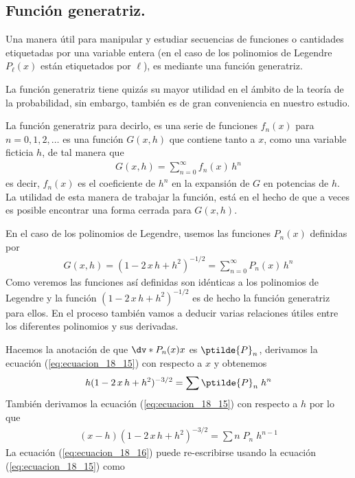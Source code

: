 \subsection{Función generatriz.}
Una manera útil para manipular y estudiar secuencias de funciones o cantidades etiquetadas por una variable entera (en el caso de los polinomios de Legendre $P_{\ell} (x)$ están etiquetados por $\ell$), es mediante una función generatriz. 
\par
La función generatriz tiene quizás su mayor utilidad en el ámbito de la teoría de la probabilidad, sin embargo, también es de gran conveniencia en nuestro estudio.
\par
La función generatriz para decirlo, es una serie de funciones $f_{n} (x)$ para $n = 0, 1, 2,\ldots$ es una función $G (x, h)$ que contiene tanto a $x$, como una variable ficticia $h$, de tal manera que
\begin{align*}
G(x,h) = \sum_{n=0}^{\infty} f_{n} (x) \, h^{n}
\end{align*}
es decir, $f_{n}(x)$ es el coeficiente de $h^{n}$ en la expansión de $G$ en potencias de $h$. La utilidad de esta manera de trabajar la función, está en el hecho de que a veces es posible encontrar una forma cerrada para $G(x, h)$.
\par
En el caso de los polinomios de Legendre, usemos las funciones $P_{n}(x)$ definidas por
\begin{align}
G(x ,h) = (1 - 2 \, x \, h + h^{2})^{-1/2} =  \sum_{n=0}^{\infty} P_{n}(x) \, h^{n}
\label{eq:ecuacion_18_15}
\end{align}
Como veremos las funciones así definidas son idénticas a los polinomios de Legendre y la función $(1 - 2 \, x \, h + h^{2})^{-1/2}$ es de hecho la función generatriz para ellos. En el proceso también vamos a deducir varias relaciones útiles entre los diferentes polinomios y sus derivadas.
\par
Hacemos la anotación de que $\dv*{P_{n}(x)}{x}$ es $\ptilde{P}_{n}$, derivamos la ecuación (\ref{eq:ecuacion_18_15}) con respecto a $x$ y obtenemos
\begin{align}
h (1 - 2 \, x \, h + h^{2})^{-3/2} = \sum \ptilde{P}_{n} \; h^{n}
\label{eq:ecuacion_18_16}
\end{align}
También derivamos la ecuación (\ref{eq:ecuacion_18_15}) con respecto a $h$ por lo que
\begin{align}
(x - h) (1 - 2 \, x \, h + h^{2})^{-3/2} = \sum n \; P_{n} \; h^{n-1}
\label{eq:ecuacion_18_17}
\end{align}
La ecuación (\ref{eq:ecuacion_18_16}) puede re-escribirse usando la ecuación (\ref{eq:ecuacion_18_15}) como

